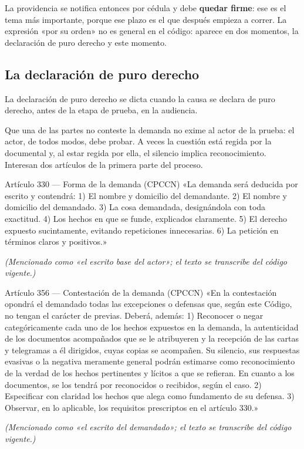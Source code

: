 \documentclass[12pt,oneside]{book}
\begin{document}
La providencia se notifica entonces por cédula y debe \textbf{quedar firme}: ese es el tema más importante, porque ese plazo es el que después empieza a correr. La expresión «por su orden» no es general en el código: aparece en dos momentos, la declaración de puro derecho y este momento.

\subsection{La declaración de puro derecho}

La declaración de puro derecho se dicta cuando la causa se declara de puro derecho, antes de la etapa de prueba, en la audiencia.

Que una de las partes no conteste la demanda no exime al actor de la prueba: el actor, de todos modos, debe probar. A veces la cuestión está regida por la documental y, al estar regida por ella, el silencio implica reconocimiento. Interesan dos artículos de la primera parte del proceso.

\begin{norma}{Artículo 330 --- Forma de la demanda (CPCCN)}
«La demanda será deducida por escrito y contendrá: 1) El nombre y domicilio del demandante. 2) El nombre y domicilio del demandado. 3) La cosa demandada, designándola con toda exactitud. 4) Los hechos en que se funde, explicados claramente. 5) El derecho expuesto sucintamente, evitando repeticiones innecesarias. 6) La petición en términos claros y positivos.»

\textit{(Mencionado como «el escrito base del actor»; el texto se transcribe del código vigente.)}
\end{norma}

\begin{norma}{Artículo 356 --- Contestación de la demanda (CPCCN)}
«En la contestación opondrá el demandado todas las excepciones o defensas que, según este Código, no tengan el carácter de previas. Deberá, además: 1) Reconocer o negar categóricamente cada uno de los hechos expuestos en la demanda, la autenticidad de los documentos acompañados que se le atribuyeren y la recepción de las cartas y telegramas a él dirigidos, cuyas copias se acompañen. Su silencio, sus respuestas evasivas o la negativa meramente general podrán estimarse como reconocimiento de la verdad de los hechos pertinentes y lícitos a que se refieran. En cuanto a los documentos, se los tendrá por reconocidos o recibidos, según el caso. 2) Especificar con claridad los hechos que alega como fundamento de su defensa. 3) Observar, en lo aplicable, los requisitos prescriptos en el artículo 330.»

\textit{(Mencionado como «el escrito del demandado»; el texto se transcribe del código vigente.)}
\end{norma}
\end{document}
